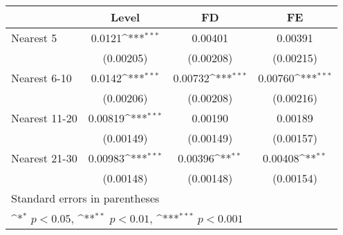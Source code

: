 {
\def\sym#1{\ifmmode^{#1}\else\(^{#1}\)\fi}
\begin{tabular}{l*{3}{c}}
\hline\hline
            &\multicolumn{1}{c}{Level}&\multicolumn{1}{c}{FD}&\multicolumn{1}{c}{FE}\\
\hline
Nearest 5   &      0.0121\sym{***}&     0.00401         &     0.00391         \\
            &   (0.00205)         &   (0.00208)         &   (0.00215)         \\
[1em]
Nearest 6-10&      0.0142\sym{***}&     0.00732\sym{***}&     0.00760\sym{***}\\
            &   (0.00206)         &   (0.00208)         &   (0.00216)         \\
[1em]
Nearest 11-20&     0.00819\sym{***}&     0.00190         &     0.00189         \\
            &   (0.00149)         &   (0.00149)         &   (0.00157)         \\
[1em]
Nearest 21-30&     0.00983\sym{***}&     0.00396\sym{**} &     0.00408\sym{**} \\
            &   (0.00148)         &   (0.00148)         &   (0.00154)         \\
\hline\hline
\multicolumn{4}{l}{\footnotesize Standard errors in parentheses}\\
\multicolumn{4}{l}{\footnotesize \sym{*} \(p<0.05\), \sym{**} \(p<0.01\), \sym{***} \(p<0.001\)}\\
\end{tabular}
}
